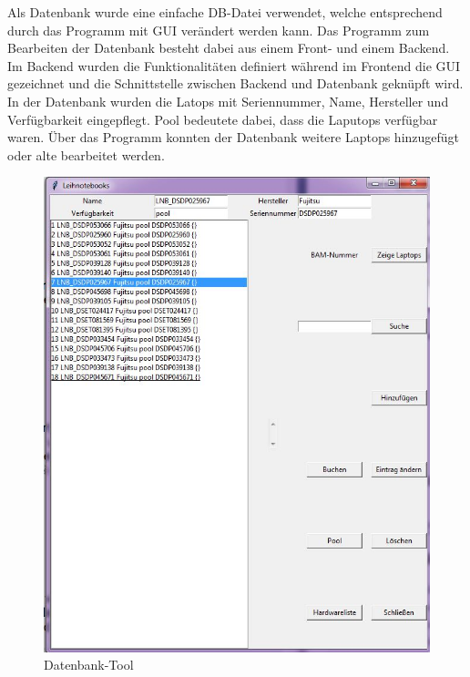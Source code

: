 \noindent
Als Datenbank wurde eine einfache DB-Datei verwendet, welche entsprechend durch das Programm mit GUI verändert werden kann. Das Programm zum Bearbeiten der Datenbank besteht dabei aus einem Front- und einem Backend. Im Backend wurden die Funktionalitäten definiert während im Frontend die GUI gezeichnet und die Schnittstelle zwischen Backend und Datenbank geknüpft wird. In der Datenbank wurden die Latops mit Seriennummer, Name, Hersteller und Verfügbarkeit eingepflegt. Pool bedeutete dabei, dass die Laputops verfügbar waren. Über das Programm konnten der Datenbank weitere Laptops hinzugefügt oder alte bearbeitet werden.
\begin{figure}[H] 
  \centering
     \includegraphics[width=1\textwidth]{frontend.jpg}
  \caption{Datenbank-Tool}
  \label{fig:Bild1}
\end{figure}

